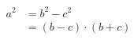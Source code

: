 \begin{align}
    a^2 & = b^2 - c^2               \label{eqn:binomial}\\
        & = (b - c) \cdot (b + c)   \label{eqn:binomial_alternative}
\end{align}
